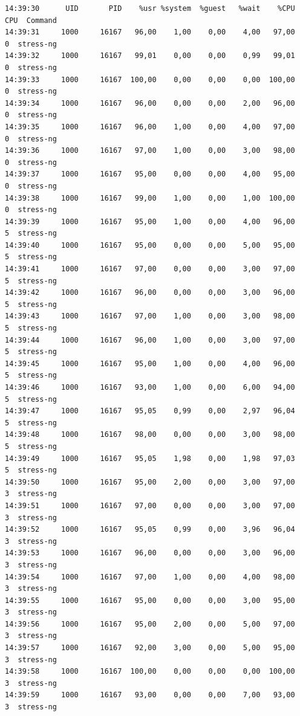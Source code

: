 \begin{verbatim}
14:39:30      UID       PID    %usr %system  %guest   %wait    %CPU   CPU  Command
14:39:31     1000     16167   96,00    1,00    0,00    4,00   97,00     0  stress-ng
14:39:32     1000     16167   99,01    0,00    0,00    0,99   99,01     0  stress-ng
14:39:33     1000     16167  100,00    0,00    0,00    0,00  100,00     0  stress-ng
14:39:34     1000     16167   96,00    0,00    0,00    2,00   96,00     0  stress-ng
14:39:35     1000     16167   96,00    1,00    0,00    4,00   97,00     0  stress-ng
14:39:36     1000     16167   97,00    1,00    0,00    3,00   98,00     0  stress-ng
14:39:37     1000     16167   95,00    0,00    0,00    4,00   95,00     0  stress-ng
14:39:38     1000     16167   99,00    1,00    0,00    1,00  100,00     0  stress-ng
14:39:39     1000     16167   95,00    1,00    0,00    4,00   96,00     5  stress-ng
14:39:40     1000     16167   95,00    0,00    0,00    5,00   95,00     5  stress-ng
14:39:41     1000     16167   97,00    0,00    0,00    3,00   97,00     5  stress-ng
14:39:42     1000     16167   96,00    0,00    0,00    3,00   96,00     5  stress-ng
14:39:43     1000     16167   97,00    1,00    0,00    3,00   98,00     5  stress-ng
14:39:44     1000     16167   96,00    1,00    0,00    3,00   97,00     5  stress-ng
14:39:45     1000     16167   95,00    1,00    0,00    4,00   96,00     5  stress-ng
14:39:46     1000     16167   93,00    1,00    0,00    6,00   94,00     5  stress-ng
14:39:47     1000     16167   95,05    0,99    0,00    2,97   96,04     5  stress-ng
14:39:48     1000     16167   98,00    0,00    0,00    3,00   98,00     5  stress-ng
14:39:49     1000     16167   95,05    1,98    0,00    1,98   97,03     5  stress-ng
14:39:50     1000     16167   95,00    2,00    0,00    3,00   97,00     3  stress-ng
14:39:51     1000     16167   97,00    0,00    0,00    3,00   97,00     3  stress-ng
14:39:52     1000     16167   95,05    0,99    0,00    3,96   96,04     3  stress-ng
14:39:53     1000     16167   96,00    0,00    0,00    3,00   96,00     3  stress-ng
14:39:54     1000     16167   97,00    1,00    0,00    4,00   98,00     3  stress-ng
14:39:55     1000     16167   95,00    0,00    0,00    3,00   95,00     3  stress-ng
14:39:56     1000     16167   95,00    2,00    0,00    5,00   97,00     3  stress-ng
14:39:57     1000     16167   92,00    3,00    0,00    5,00   95,00     3  stress-ng
14:39:58     1000     16167  100,00    0,00    0,00    0,00  100,00     3  stress-ng
14:39:59     1000     16167   93,00    0,00    0,00    7,00   93,00     3  stress-ng

\end{verbatim}
